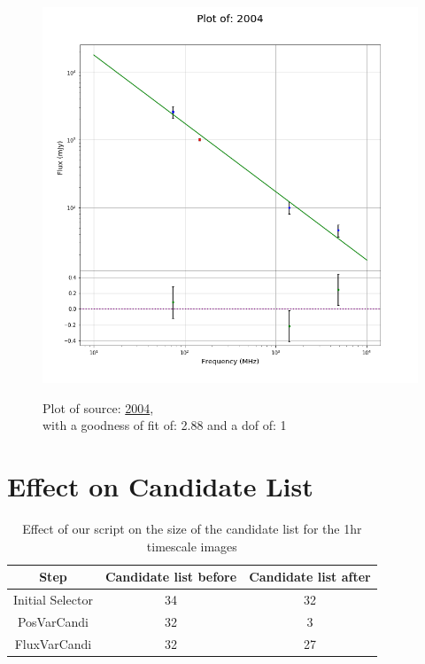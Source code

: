 \documentclass{article}
\begin{document}
\begin{figure}[H]
\begin{minipage}{0.5\textwidth}
        \includegraphics[scale = 0.35]{KmeulenTrap4P23_1hr/1hr2004.png}
        \captionsetup{labelformat=empty}
        \caption{Plot of source: \href{http://banana.transientskp.org/r4/vlo_KmeulenTrap4P23/runningcatalog/2004}{2004},\\with a goodness of fit of: 2.88 and a dof of: 1}
    \addtocounter{figure}{-1}
    \label{KmeulenTrap4P23:1hr:2004:plot}
    \end{minipage}
\end{figure}
\section{Effect on Candidate List}
\begin{table}[H]
    \centering
    \begin{tabular}{|c| c | c|}
    \toprule
     Step & Candidate list before & Candidate list after\\
    \midrule
        Initial Selector & 34 & 32 \\
        PosVarCandi & 32 & 3 \\
        FluxVarCandi & 32 & 27  \\
        \midrule
    \end{tabular}
    \caption{Effect of our script on the size of the candidate list for the 1hr timescale images}
    \label{KmeulenTrap4P23:1hr:overviewcandidates}
\end{table}
\end{document}
